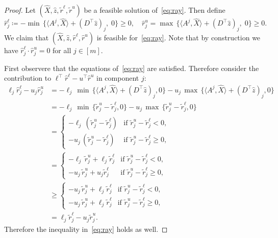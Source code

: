 \documentclass[10pt, a4paper]{article}
\newcommand{\define}{\coloneqq}
\newcommand{\skal}[2]{\langle{#1},{#2}\rangle}
\newcommand{\T}{^{\top}}
\begin{document}
\begin{proof}
  Let $(\hat{X}, \hat{z}, \tilde{r}^\ell, \tilde{r}^u)$ be a feasible
  solution of~\eqref{eq:ray}. Then define
  \[
    \hat{r}^\ell_j \define - \min\,\{\skal{A^j}{\hat{X}} + (D\T \hat{z})_j,\; 0\} \geq 0,
    \quad
    \hat{r}^u_j = \max\,\{\skal{A^j}{\hat{X}} + (D\T \hat{z})_j,\; 0\} \geq 0.
  \]
  We claim that $(\hat{X}, \hat{z}, \hat{r}^\ell, \hat{r}^u)$ is feasible
  for~\eqref{eq:ray}. Note that by construction we have
  $\hat{r}^\ell_j \cdot \hat{r}^u_j = 0$ for all $j \in [m]$.

  First observere that the equations of~\eqref{eq:ray} are
  satisfied. Therefore consider the contribution to
  $\ell\T \hat{r}^\ell - u\T \hat{r}^u$ in component $j$:
  \begin{align*}
    \ell_j \hat{r}^\ell_j - u_j \hat{r}^u_j & = - \ell_j\, \min\,\{\skal{A^j}{\hat{X}} + (D\T \hat{z})_j, 0\} - u_j\, \max\,\{\skal{A^j}{\hat{X}} + (D\T \hat{z})_j, 0\}\\
    & = - \ell_j\, \min\,\{\tilde{r}^u_j - \tilde{r}^\ell_j, 0\} - u_j\, \max\,\{\tilde{r}^u_j - \tilde{r}^\ell_j, 0\}\\
    & = \begin{cases}
      - \ell_j\, (\tilde{r}^u_j - \tilde{r}^\ell_j) & \text{if } \tilde{r}^u_j - \tilde{r}^\ell_j < 0,\\
      - u_j\, (\tilde{r}^u_j - \tilde{r}^\ell_j) & \text{if } \tilde{r}^u_j - \tilde{r}^\ell_j \geq 0,
    \end{cases}\\
    & = \begin{cases}
      - \ell_j\, \tilde{r}^u_j + \ell_j \tilde{r}^\ell_j & \text{if } \tilde{r}^u_j - \tilde{r}^\ell_j < 0,\\
      - u_j\, \tilde{r}^u_j + u_j \tilde{r}^\ell_j & \text{if } \tilde{r}^u_j - \tilde{r}^\ell_j \geq 0,
    \end{cases}\\
    & \geq \begin{cases}
      - u_j\, \tilde{r}^u_j + \ell_j \tilde{r}^\ell_j & \text{if }  \tilde{r}^u_j - \tilde{r}^\ell_j < 0,\\
      - u_j\, \tilde{r}^u_j + \ell_j \tilde{r}^\ell_j & \text{if } \tilde{r}^u_j - \tilde{r}^\ell_j \geq 0,
    \end{cases}\\
    & = \ell_j \tilde{r}^\ell_j - u_j \tilde{r}^u_j.
  \end{align*}
  Therefore the inequality in~\eqref{eq:ray} holds as well.
\end{proof}
\end{document}

